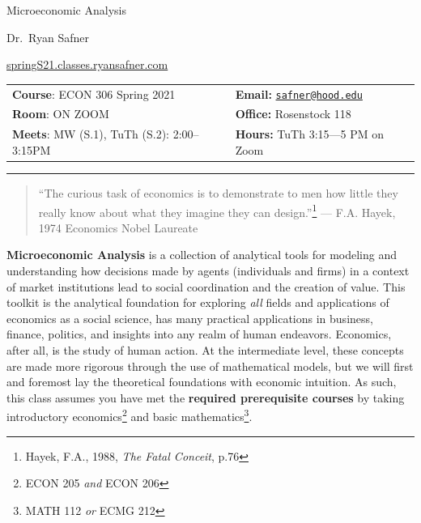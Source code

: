 \documentclass{article}
\begin{document}
\sffamily

\centerline{\Huge Microeconomic Analysis}

\vspace{3 mm}

\centerline{\large Dr.~Ryan Safner}
\vspace{2 mm}
\centerline{\large \href{http://springS21.classes.ryansafner.com}{springS21.classes.ryansafner.com}}

\vspace{5 mm}

\begin{tabular}{@{}p{3.5in}p{3.5in}}           
\textbf{Course}: ECON 306 Spring
2021  & \textbf{Email:}  \href{mailto:safner@hood.edu}{\nolinkurl{safner@hood.edu}}\\
\textbf{Room}:  ON ZOOM & \textbf{Office:}  Rosenstock 118\\
\textbf{Meets}: MW (S.1), TuTh (S.2): 2:00--3:15PM & \textbf{Hours:} 
TuTh 3:15---5 PM on Zoom\\ 
\end{tabular}

\vspace{5 mm}

\hrule


\begin{quote}
``The curious task of economics is to demonstrate to men how little they
really know about what they imagine they can design.''\footnote{Hayek,
  F.A., 1988, \emph{The Fatal Conceit}, p.76} --- F.A. Hayek, 1974
Economics Nobel Laureate
\end{quote}

\textbf{Microeconomic Analysis} is a collection of analytical tools for
modeling and understanding how decisions made by agents (individuals and
firms) in a context of market institutions lead to social coordination
and the creation of value. This toolkit is the analytical foundation for
exploring \emph{all} fields and applications of economics as a social
science, has many practical applications in business, finance, politics,
and insights into any realm of human endeavors. Economics, after all, is
the study of human action. At the intermediate level, these concepts are
made more rigorous through the use of mathematical models, but we will
first and foremost lay the theoretical foundations with economic
intuition. As such, this class assumes you have met the \textbf{required
prerequisite courses} by taking introductory economics\footnote{ECON 205
  \emph{and} ECON 206} and basic mathematics\footnote{MATH 112 \emph{or}
  ECMG 212}.
\end{document}
